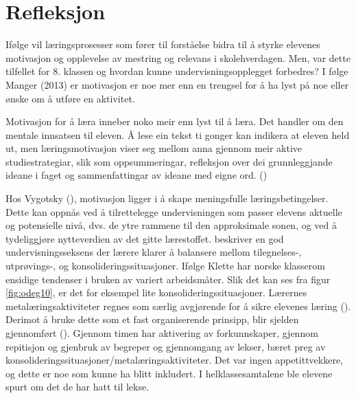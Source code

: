 \documentclass[main.tex]{subfiles}
\begin{document}
\section*{Refleksjon}
\label{sec:3}

Ifølge  vil læringsprosesser som fører til forståelse bidra til å styrke elevenes 
motivasjon og opplevelse av mestring og relevans i skolehverdagen. Men, var dette tilfellet for 8. 
klassen og hvordan kunne undervisningsopplegget forbedres?
\newline
\newline
I følge Manger (2013) er motivasjon er noe mer enn en trengsel for å ha lyst på noe eller ønske om å 
utføre en aktivitet.
\begin{displayquote}
Motivasjon for å læra inneber noko meir enn lyst til å læra. Det handler om den 
mentale innsatsen til eleven. Å lese ein tekst ti gonger kan indikera at eleven held ut, men  
læringsmotivasjon viser seg mellom anna gjennom meir aktive studiestrategiar, slik som 
oppsummeringar, refleksjon over dei grunnleggjande ideane i faget og sammenfattingar av ideane med 
eigne ord. ()
\end{displayquote}
Hos Vygotsky (), motivasjon ligger i å skape meningsfulle læringsbetingelser. 
Dette kan oppnås ved å tilrettelegge undervisningen som passer elevens aktuelle og potensielle nivå, 
dvs. de ytre rammene til den approksimale sonen, og ved å tydeliggjøre nytteverdien av det gitte 
lærestoffet.
\newline
\newline
{} beskriver en god undervisningsseksens der lærere klarer å balansere mellom 
tilegnelses-, utprøvings-, og konsolideringssituasjoner. Ifølge Klette har norske klasserom ensidige 
tendenser i bruken av variert arbeidsmåter. Slik det kan ses fra figur \ref{fig:odeg10}, er det for 
eksempel lite konsolideringssituasjoner. Lærernes metalæringsaktiviteter regnes som særlig 
avgjørende for å sikre elevenes læring (). Derimot å bruke dette som et fast
organiserende prinsipp, blir sjelden gjennomført (). Gjennom timen har 
aktivering av forkunnskaper, gjennom repitisjon og gjenbruk av begreper og gjennomgang av 
lekser, bæret preg av konsolideringssituasjoner/metalæringsaktiviteter. Det var ingen 
appetittvekkere, og dette er noe som kunne ha blitt inkludert.
\newline
\newline
I helklassesamtalene ble elevene spurt om det de har hatt til lekse.
\end{document}
